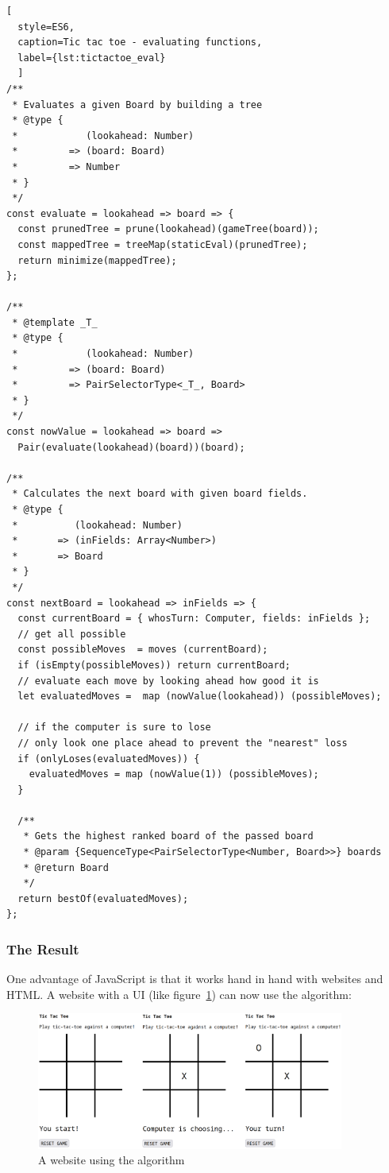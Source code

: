 \begin{lstlisting}[
  style=ES6, 
  caption=Tic tac toe - evaluating functions,
  label={lst:tictactoe_eval}
  ]
/**
 * Evaluates a given Board by building a tree
 * @type {
 *            (lookahead: Number)
 *         => (board: Board)
 *         => Number
 * }
 */
const evaluate = lookahead => board => {
  const prunedTree = prune(lookahead)(gameTree(board));
  const mappedTree = treeMap(staticEval)(prunedTree);
  return minimize(mappedTree);
};

/**
 * @template _T_
 * @type {
 *            (lookahead: Number)
 *         => (board: Board)
 *         => PairSelectorType<_T_, Board>
 * }
 */
const nowValue = lookahead => board =>
  Pair(evaluate(lookahead)(board))(board);

/**
 * Calculates the next board with given board fields.
 * @type {
 *          (lookahead: Number)
 *       => (inFields: Array<Number>)
 *       => Board
 * }
 */
const nextBoard = lookahead => inFields => {
  const currentBoard = { whosTurn: Computer, fields: inFields };
  // get all possible
  const possibleMoves  = moves (currentBoard);
  if (isEmpty(possibleMoves)) return currentBoard;
  // evaluate each move by looking ahead how good it is
  let evaluatedMoves =  map (nowValue(lookahead)) (possibleMoves);

  // if the computer is sure to lose 
  // only look one place ahead to prevent the "nearest" loss
  if (onlyLoses(evaluatedMoves)) {
    evaluatedMoves = map (nowValue(1)) (possibleMoves);
  }

  /**
   * Gets the highest ranked board of the passed board
   * @param {SequenceType<PairSelectorType<Number, Board>>} boards
   * @return Board
   */
  return bestOf(evaluatedMoves);
};
\end{lstlisting}

\subsubsection{The Result} %
\label{sec:ttt_result}
One advantage of JavaScript is that it works hand in hand with websites and
HTML. A website with a UI (like figure~\ref{img:ttt_playfield}) can now use the
algorithm:\\

\begin{figure}[H]
    \centering
    \includegraphics[width=0.9\textwidth]{./mainmatter/pictures/tic-tac-toe-field.png}
    \caption{A website using the algorithm}
    \label{img:ttt_playfield}
\end{figure}


